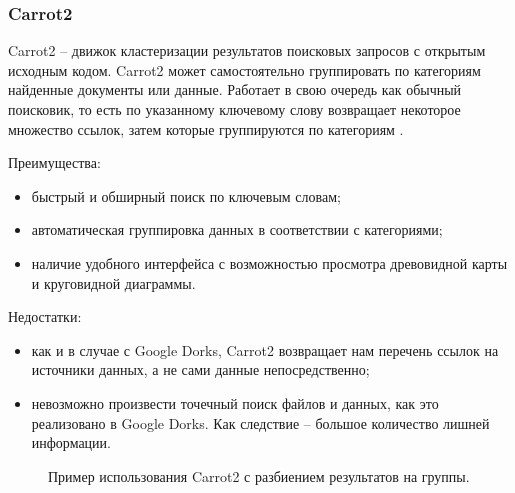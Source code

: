 \subsubsection{Carrot2}
Carrot2 -- движок кластеризации результатов поисковых запросов с открытым исходным кодом. Carrot2 может самостоятельно
группировать по категориям найденные документы или данные. Работает в свою очередь как обычный поисковик, то есть
по указанному ключевому слову возвращает некоторое множество ссылок, затем которые группируются по категориям 
\cite{carrot2wikipedia}.

\par
Преимущества:
\begin{itemize}
    \item быстрый и обширный поиск по ключевым словам;
    \item автоматическая группировка данных в соответствии с категориями;
    \item наличие удобного интерфейса с возможностью просмотра древовидной карты и круговидной диаграммы.
\end{itemize}

\par
Недостатки:
\begin{itemize}
    \item как и в случае с Google Dorks, Carrot2 возвращает нам перечень ссылок на источники данных, а не сами данные
     непосредственно;
    \item невозможно произвести точечный поиск файлов и данных, как это реализовано в Google Dorks. Как следствие -- 
    большое количество лишней информации.
\end{itemize}


\begin{figure}[H]
    \caption{Пример использования Carrot2 с разбиением результатов на группы.}
    \label{ris:image}
\end{figure}


